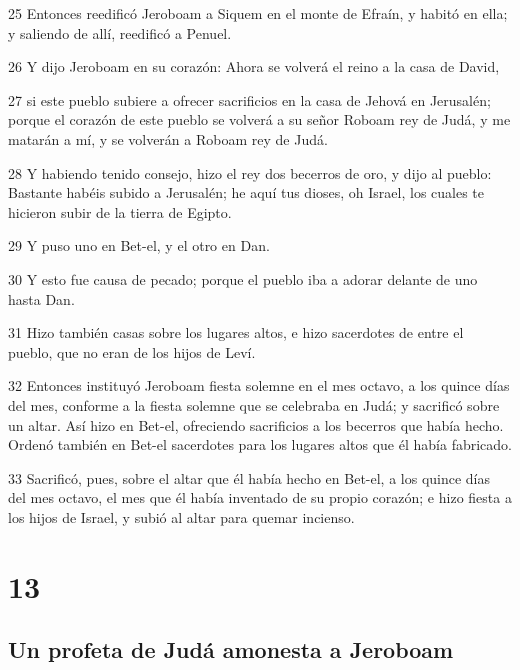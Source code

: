 \par 25 Entonces reedificó Jeroboam a Siquem en el monte de Efraín, y habitó en ella; y saliendo de allí, reedificó a Penuel.
\par 26 Y dijo Jeroboam en su corazón: Ahora se volverá el reino a la casa de David,
\par 27 si este pueblo subiere a ofrecer sacrificios en la casa de Jehová en Jerusalén; porque el corazón de este pueblo se volverá a su señor Roboam rey de Judá, y me matarán a mí, y se volverán a Roboam rey de Judá.
\par 28 Y habiendo tenido consejo, hizo el rey dos becerros de oro, y dijo al pueblo: Bastante habéis subido a Jerusalén; he aquí tus dioses, oh Israel, los cuales te hicieron subir de la tierra de Egipto. 
\par 29 Y puso uno en Bet-el, y el otro en Dan.
\par 30 Y esto fue causa de pecado; porque el pueblo iba a adorar delante de uno hasta Dan.
\par 31 Hizo también casas sobre los lugares altos, e hizo sacerdotes de entre el pueblo, que no eran de los hijos de Leví.
\par 32 Entonces instituyó Jeroboam fiesta solemne en el mes octavo, a los quince días del mes, conforme a la fiesta solemne que se celebraba en Judá; y sacrificó sobre un altar. Así hizo en Bet-el, ofreciendo sacrificios a los becerros que había hecho. Ordenó también en Bet-el sacerdotes para los lugares altos que él había fabricado.
\par 33 Sacrificó, pues, sobre el altar que él había hecho en Bet-el, a los quince días del mes octavo, el mes que él había inventado de su propio corazón; e hizo fiesta a los hijos de Israel, y subió al altar para quemar incienso.

\chapter{13}

\section*{Un profeta de Judá amonesta a Jeroboam}


